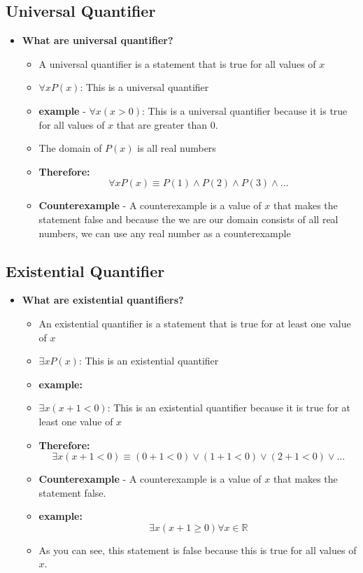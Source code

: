 \documentclass{article}
\begin{document}
\subsection{Universal Quantifier}
    \begin{itemize}
        \item[]\textbf{What are universal quantifier?}
        \begin{itemize}
            \item[] A universal quantifier is a statement that is true for all values of $x$
            \item[] $\forall x P(x)$: This is a universal quantifier
            \item[] \textbf{example} - $\forall x (x > 0)$: This is a universal quantifier because 
            it is true for all values of $x$ that are greater than 0.
            \item[] The domain of $P(x)$ is all real numbers
            \item[] \textbf{Therefore:}
            \[
                \forall xP(x) \equiv P(1) \land P(2) \land P(3) \land \dots
            \]
            \item[] \textbf{Counterexample} - A counterexample is a value of $x$ that makes the statement false and 
            because the we are our domain consists of all real numbers, we can use any real number as a counterexample
        \end{itemize}
    \end{itemize}

    \subsection{Existential Quantifier}
    \begin{itemize}
        \item[] \textbf{What are existential quantifiers?}
        \begin{itemize}
            \item[] An existential quantifier is a statement that is true for at least one value of $x$

            \item[] $\exists x P(x)$: This is an existential quantifier
            \item[] \textbf{example:}
            \item[] $\exists x (x + 1 < 0)$: This is an existential quantifier because it is true for at least one value of $x$
           \item[] \textbf{Therefore:}
            \[
                \exists x(x + 1 < 0) \equiv (0 + 1 < 0) \lor (1 + 1 < 0) \lor (2 + 1 < 0) \lor \dots
            \]
            \item[] \textbf{Counterexample} - A counterexample is a value of $x$ that makes the statement false.
            \item[] \textbf{example:} 
            \[
                \exists x(x + 1 \geq 0) {\forall x \in \mathbb{R}}    
            \]
            \item[] As you can see, this statement is false because this is true for all values of $x$.    
        \end{itemize}  
    \end{itemize}
\end{document}
